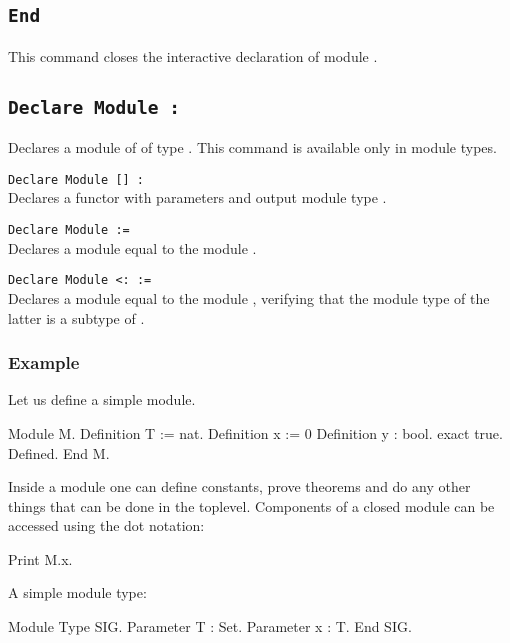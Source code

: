 \subsection{\tt End {\ident}}
This command closes the interactive declaration of module {\ident}.

\subsection{\tt Declare Module {\ident} : \modtype}
Declares a module of {\ident} of type {\modtype}. This command is available
only in module types. 

\begin{Variants}
\item{\tt Declare Module {\ident} [\modbindings] \verb.:. \modtype}\\
  Declares a functor with parameters {\modbindings} and output module
  type \modtype.
\item{\tt Declare Module {\ident} := {\qualid}}\\
  Declares a module equal to the module {\qualid}.
\item{\tt Declare Module {\ident} \verb.<:. {\modtype} := {\qualid}}\\
  Declares a module equal to the module {\qualid}, verifying that the
  module type of the latter is a subtype of {\modtype}.
\end{Variants}


\subsubsection{Example}

Let us define a simple module.
\begin{coq_example}
Module M.
Definition T := nat.
Definition x := 0%
Definition y : bool.
  exact true.
Defined.
End M.
\end{coq_example}

\noindent
Inside a module one can define constants, prove theorems and do any
other things that can be done in the toplevel. Components of a closed
module can be accessed using the dot notation:

\begin{coq_example}
Print M.x.
\end{coq_example}
A simple module type:
\begin{coq_example}
Module Type SIG.
Parameter T : Set.
Parameter x : T.
End SIG.
\end{coq_example}

